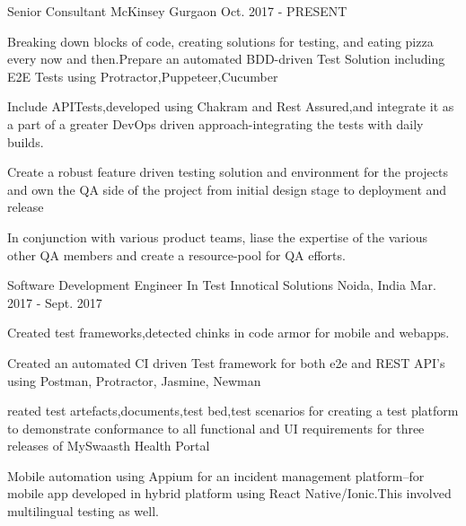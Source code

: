 

\begin{cventries}

  \cventry
    {Senior Consultant} %
    {McKinsey} %
    {Gurgaon} %
    {Oct. 2017 - PRESENT} %
    {
      \begin{cvitems} %
        \item {Breaking down blocks of code, creating solutions for testing, and eating pizza every now and then.Prepare an automated BDD-driven Test Solution including E2E Tests using Protractor,Puppeteer,Cucumber}
        \item {Include APITests,developed using Chakram and Rest Assured,and integrate it as a part of a greater DevOps driven approach-integrating the tests with daily builds.}
        \item {Create a robust feature driven testing solution and environment for the projects and own the QA side of the project from initial design stage to deployment and release}
        \item{In conjunction with various product teams, liase the expertise of the various other QA members and create a resource-pool for QA efforts.}
      \end{cvitems}
    }


  \cventry
    {Software Development Engineer In Test} %
    {Innotical Solutions} %
    {Noida, India} %
    {Mar. 2017 - Sept. 2017} %
    {
      \begin{cvitems} %
        \item {Created test frameworks,detected chinks in code armor for mobile and webapps.}
        \item{Created an automated CI driven Test framework for both e2e and REST API's using Postman, Protractor, Jasmine, Newman}
        \item {reated test artefacts,documents,test bed,test scenarios for creating a test platform to demonstrate conformance to all functional and UI requirements for three releases of MySwaasth Health Portal}
        \item {Mobile automation using Appium for an incident management platform–for mobile app developed in hybrid platform using React Native/Ionic.This involved multilingual
testing as well.}
      \end{cvitems}
    }


\end{cventries}
